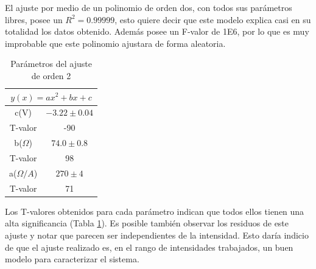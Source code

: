 \documentclass[twoside,twocolumn,a4paper]{article}
\begin{document}

El ajuste por medio de un polinomio de orden dos, con todos sus par\'ametros libres, posee un $R^2=0.99999$, esto quiere decir que este modelo explica casi en su totalidad los datos obtenido. Adem\'as posee un F-valor de 1E6, por lo que es muy improbable que este polinomio ajustara de forma aleatoria.\par

\begin{table}[h!]
\centering
\caption{Par\'ametros del ajuste de orden 2}
\label{tab:o2}
\begin{tabular}{|c|c|}
\hline
\multicolumn{2}{|c|}{$y(x)=ax^2+bx+c$} \\ \hline
c(V)           & $-3.22\pm0.04$        \\ \hline
T-valor        & -90                   \\ \hline
b($\Omega$)     & $74.0\pm0.8$          \\ \hline
T-valor        & 98                    \\ \hline
a($\Omega/A$)  & $270\pm4$             \\ \hline
T-valor        & 71                    \\ \hline
\end{tabular}
\end{table}

Los T-valores obtenidos para cada par\'ametro indican que todos ellos tienen una alta significancia (Tabla \ref{tab:o2}). Es posible tambi\'en observar los residuos de este ajuste y notar que parecen ser independientes de la intensidad. Esto dar\'ia indicio de que el ajuste realizado es, en el rango de intensidades trabajados, un buen modelo para caracterizar el sistema.\par
\end{document}
